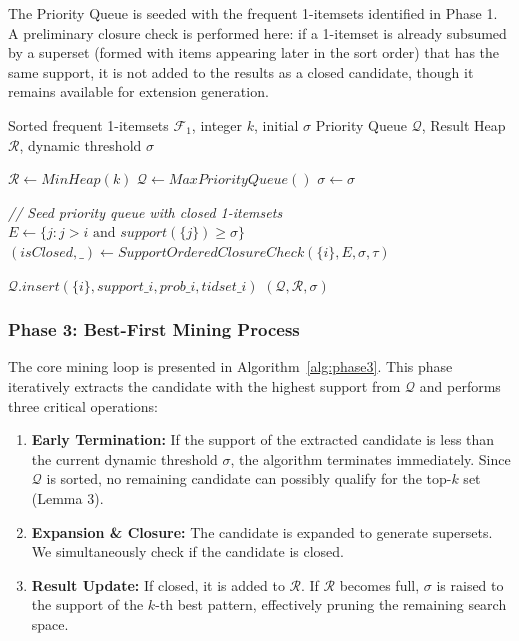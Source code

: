 \documentclass[10pt,letterpaper]{article}
\begin{document}
The Priority Queue is seeded with the frequent 1-itemsets identified in Phase 1. A preliminary closure check is performed here: if a 1-itemset is already subsumed by a superset (formed with items appearing later in the sort order) that has the same support, it is not added to the results as a closed candidate, though it remains available for extension generation.

\begin{algorithm}[H]
\caption{Phase 2: Initialization}
\label{alg:phase2}
\begin{algorithmic}[1]
\footnotesize
\REQUIRE Sorted frequent 1-itemsets $\mathcal{F}_1$, integer $k$, initial $\sigma$
\ENSURE Priority Queue $\mathcal{Q}$, Result Heap $\mathcal{R}$, dynamic threshold $\sigma$

\STATE $\mathcal{R} \leftarrow MinHeap(k)$ 
\STATE $\mathcal{Q} \leftarrow MaxPriorityQueue()$ 
\STATE $\sigma \leftarrow \sigma$

\STATE \textit{// Seed priority queue with closed 1-itemsets}
    \STATE $E \leftarrow \{j : j > i \text{ and } support(\{j\}) \geq \sigma\}$
    \STATE $(isClosed, \_) \leftarrow SupportOrderedClosureCheck(\{i\}, E, \sigma, \tau)$
    
        \STATE $\mathcal{Q}.insert(\{i\}, support\_i, prob\_i, tidset\_i)$
    \ENDIF
\ENDFOR
\RETURN $(\mathcal{Q}, \mathcal{R}, \sigma)$
\end{algorithmic}
\end{algorithm}

\subsubsection*{Phase 3: Best-First Mining Process}
The core mining loop is presented in Algorithm~\ref{alg:phase3}. This phase iteratively extracts the candidate with the highest support from $\mathcal{Q}$ and performs three critical operations:
\begin{enumerate}
    \item \textbf{Early Termination:} If the support of the extracted candidate is less than the current dynamic threshold $\sigma$, the algorithm terminates immediately. Since $\mathcal{Q}$ is sorted, no remaining candidate can possibly qualify for the top-$k$ set (Lemma 3).
    \item \textbf{Expansion \& Closure:} The candidate is expanded to generate supersets. We simultaneously check if the candidate is closed.
    \item \textbf{Result Update:} If closed, it is added to $\mathcal{R}$. If $\mathcal{R}$ becomes full, $\sigma$ is raised to the support of the $k$-th best pattern, effectively pruning the remaining search space.
\end{enumerate}
\end{document}
